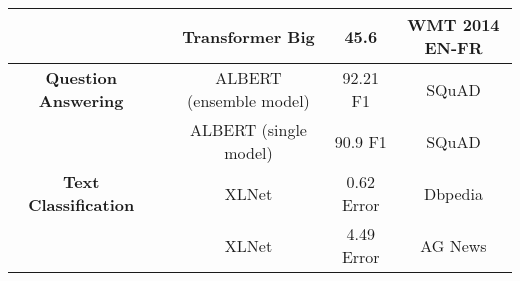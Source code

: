 \begin{sidewaystable}[!htbp]
\begin{center}
\begin{tabular}{|c|c|c|c|c|}
      & \cite{edunov2018understanding} & Transformer Big & 45.6 & WMT 2014 EN-FR\\
      \hline
      \textbf{Question Answering} & \cite{lan2019albert} & ALBERT (ensemble model) & 92.21 F1 & SQuAD\\
      & \cite{lan2019albert} & ALBERT (single model) & 90.9 F1 & SQuAD\\
      \hline
      \textbf{Text Classification} & \cite{yang2019xlnet} & XLNet & 0.62 Error & Dbpedia\\ 
      & \cite{yang2019xlnet} & XLNet & 4.49 Error & AG News\\
      \hline
    \end{tabular}
  \end{center}
\end{sidewaystable}